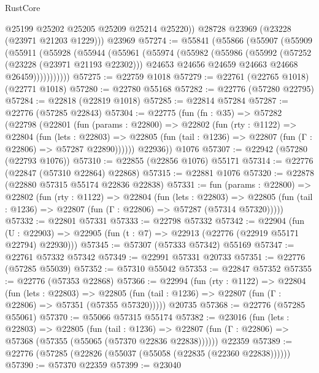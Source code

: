 \begin{lexlean}{RustCore}
\begin{coremodule}
          @25199
          @25202
          @25205
          @25209
          @25214
          @25220))
      @28728
      @23969
      (@23228 (@23971 @21203 @1229)))
    @23969
@57274 := @55841
    (@55866
      (@55907
        (@55909
          (@55911
            (@55928
              (@55944
                (@55961
                  (@55974
                    (@55982
                      (@55986
                        (@55992
                          (@57252 (@23228 (@23971 @21193 @22302)))
                          @24653
                          @24656
                          @24659
                          @24663
                          @24668
                          @26459)))))))))))
@57275 := @22759 @1018
@57279 := @22761 (@22765 @1018) (@22771 @1018)
@57280 := @22780 @55168
@57282 := @22776 (@57280 @22795)
@57284 := @22818 (@22819 @1018)
@57285 := @22814 @57284
@57287 := @22776 (@57285 @22843)
@57304 := @22775
    (fun (fn : @35) =>
    @57282
      (@22798
        (@22801
          (fun (params : @22800) =>
          @22802
            (fun (rty : @1122) =>
            @22804
              (fun (lets : @22803) =>
              @22805 (fun (tail : @1236) => @22807 (fun (Γ : @22806) => @57287 @22890))))))
        @22936))
    @1076
@57307 := @22942 (@57280 (@22793 @1076))
@57310 := @22855 (@22856 @1076) @55171
@57314 := @22776 (@22847 (@57310 @22864) @22868)
@57315 := @22881 @1076
@57320 := @22878 (@22880 @57315 @55174 @22836 @22838)
@57331 := fun (params : @22800) =>
  @22802
    (fun (rty : @1122) =>
    @22804
      (fun (lets : @22803) =>
      @22805 (fun (tail : @1236) => @22807 (fun (Γ : @22806) => @57287 (@57314 @57320)))))
@57332 := @22801 @57331
@57333 := @22798 @57332
@57342 := @22904
    (fun (U : @22903) => @22905 (fun (t : @7) => @22913 (@22776 (@22919 @55171 @22794) @22930)))
@57345 := @57307 (@57333 @57342) @55169
@57347 := @22761 @57332 @57342
@57349 := @22991 @57331 @20733
@57351 := @22776 (@57285 @55039)
@57352 := @57310 @55042
@57353 := @22847 @57352
@57355 := @22776 (@57353 @22868)
@57366 := @22994
    (fun (rty : @1122) =>
    @22804
      (fun (lets : @22803) =>
      @22805 (fun (tail : @1236) => @22807 (fun (Γ : @22806) => @57351 (@57355 @57320)))))
    @20735
@57368 := @22776 (@57285 @55061)
@57370 := @55066 @57315 @55174
@57382 := @23016
    (fun (lets : @22803) =>
    @22805
      (fun (tail : @1236) =>
      @22807 (fun (Γ : @22806) => @57368 (@57355 (@55065 (@57370 @22836 @22838))))))
    @22359
@57389 := @22776 (@57285 (@22826 (@55037 (@55058 (@22835 (@22360 @22838))))))
@57390 := @57370 @22359
@57399 := @23040

\end{coremodule}
\end{lexlean}
